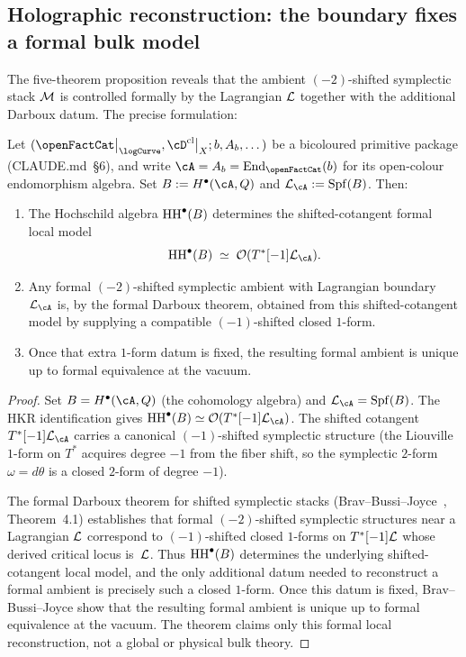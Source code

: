 \subsection{Holographic reconstruction: the boundary fixes a formal bulk model}
\label{ssec:holographic-reconstruction}

The five-theorem proposition reveals that the ambient
$(-2)$-shifted symplectic stack $\mathcal M$ is controlled formally by the
Lagrangian $\mathcal L$ together with the additional Darboux datum. The
precise formulation:

\begin{theorem}
\label{thm:holographic-reconstruction}
Let $(\openFactCat\big|_{\logCurve}, \cD^{\mathrm{cl}}\big|_X; b, A_b, \dots)$
be a bicoloured primitive package (CLAUDE.md~\S\textup{6}), and write
$\cA = A_b = \mathrm{End}_{\openFactCat}(b)$ for its open-colour
endomorphism algebra.
Set $B := H^\bullet(\cA,Q)$ and $\cL_\cA := \operatorname{Spf}(B)$.
Then:
\begin{enumerate}[label=\textup{(\roman*)}]
\item The Hochschild algebra $\operatorname{HH}^\bullet(B)$ determines the
 shifted-cotangent formal local model
 \[
 \HH^\bullet(B)\;\simeq\;\cO(T^*[-1]\cL_\cA).
 \]
\item Any formal $(-2)$-shifted symplectic ambient with
 Lagrangian boundary $\cL_\cA$ is, by the formal Darboux theorem,
 obtained from this shifted-cotangent model by supplying a
 compatible $(-1)$-shifted closed $1$-form.
\item Once that extra $1$-form datum is fixed, the resulting formal
 ambient is unique up to formal equivalence at the vacuum.
\end{enumerate}
\end{theorem}

\begin{proof}
Set $B = H^\bullet(\cA, Q)$ (the cohomology algebra) and
$\cL_\cA = \operatorname{Spf}(B)$. The HKR identification gives
$\HH^\bullet(B) \simeq \cO(T^*[-1]\cL_\cA)$. The shifted
cotangent $T^*[-1]\cL_\cA$ carries a canonical $(-1)$-shifted
symplectic structure (the Liouville $1$-form on $T^*$ acquires
degree $-1$ from the fiber shift, so the symplectic $2$-form
$\omega = d\theta$ is a closed $2$-form of degree $-1$).

The formal Darboux theorem for shifted symplectic stacks
(Brav--Bussi--Joyce~\cite{BBJ19}, Theorem~4.1) establishes
that formal $(-2)$-shifted symplectic structures near a
Lagrangian $\mathcal L$ correspond to $(-1)$-shifted closed $1$-forms
on $T^*[-1]\mathcal L$ whose derived critical locus is~$\mathcal L$.
Thus $\operatorname{HH}^\bullet(B)$ determines the underlying
shifted-cotangent local model, and the only additional datum
needed to reconstruct a formal ambient is precisely such a
closed $1$-form. Once this datum is fixed, Brav--Bussi--Joyce
show that the resulting formal ambient is unique up to formal
equivalence at the vacuum. The theorem claims only this formal
local reconstruction, not a global or physical bulk theory.
\end{proof}

